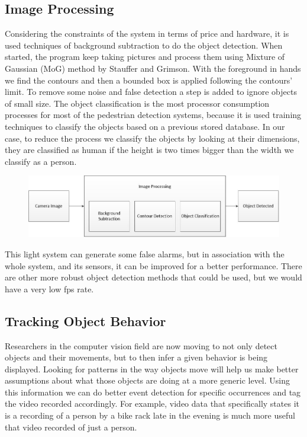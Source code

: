 \documentclass[journal,transmag]{IEEEtran}
\begin{document}
\subsection{Image Processing}
\- Considering the constraints of the system in terms of price and hardware, it is used techniques of background subtraction to do the object detection.
When started, the program keep taking pictures and process them using Mixture of Gaussian (MoG) method by Stauffer and Grimson. With the foreground in
hands we find the contours and then a bounded box is applied following the contours' limit. To remove some noise and false detection a step is added to 
ignore objects of small size. The object classification is the most processor consumption  processes for most of the pedestrian detection systems, 
because it is used training techniques to classify the objects based on a previous stored database. In our case, to reduce the process we classify the 
objects by looking at their dimensions, they are classified as human if the height is two times bigger than the width we classify as a person. \\
\begin{figure}[h!]
\centering
\includegraphics[scale=0.3]{imageprocessing.jpg}
\end{figure}	
\- This light system can generate some false alarms, but in association with the whole system, and its sensors, it can be improved for a better
performance. There are other more robust object detection methods that could be used, but we would have a very low fps rate. 

\subsection{Tracking Object Behavior}
Researchers in the computer vision  field are now moving to not only detect objects and their movements, but to then infer a given behavior is being displayed.
Looking for patterns in the way objects move will help us make better assumptions about what those objects are doing at a more generic level. Using this
information we can do better event detection for specific occurrences and tag the video recorded accordingly. For example, video data that specifically states
it is a recording of a person by a bike rack late in the evening is much more useful that video recorded of just a person.
\end{document}
